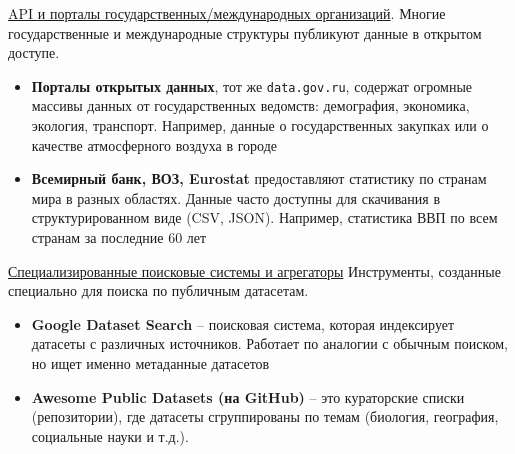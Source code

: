 \underline{API и порталы государственных/международных организаций}.
Многие государственные и международные структуры публикуют данные в открытом доступе.
\begin{itemize}
    
    \item \textbf{Порталы открытых данных}, тот же \texttt{data.gov.ru}, содержат огромные массивы данных от
    государственных ведомств: демография, экономика, экология, транспорт.
    Например, данные о государственных закупках или о качестве атмосферного воздуха в городе
    
    \item \textbf{Всемирный банк, ВОЗ, Eurostat} предоставляют статистику по странам мира в разных областях.
    Данные часто доступны для скачивания в структурированном виде (CSV, JSON).
    Например, статистика ВВП по всем странам за последние 60 лет

\end{itemize}

\underline{Специализированные поисковые системы и агрегаторы}
Инструменты, созданные специально для поиска по публичным датасетам.
\begin{itemize}
    
    \item \textbf{Google Dataset Search} -- поисковая система, которая индексирует датасеты с различных источников.
    Работает по аналогии с обычным поиском, но ищет именно метаданные датасетов
    
    \item \textbf{Awesome Public Datasets (на GitHub)} -- это кураторские списки (репозитории), где датасеты
    сгруппированы по темам (биология, география, социальные науки и т.д.).

\end{itemize}